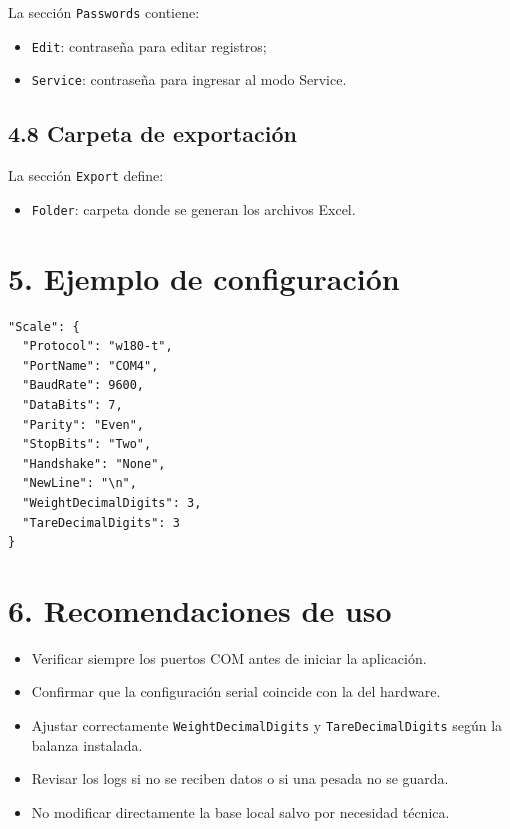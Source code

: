 \documentclass[12pt,a4paper]{article}
\begin{document}
La secci\'on \texttt{Passwords} contiene:

\begin{itemize}
\item \texttt{Edit}: contrase\~na para editar registros;
\item \texttt{Service}: contrase\~na para ingresar al modo Service.
\end{itemize}

\subsection*{4.8 Carpeta de exportaci\'on}

La secci\'on \texttt{Export} define:

\begin{itemize}
\item \texttt{Folder}: carpeta donde se generan los archivos Excel.
\end{itemize}

\section*{5. Ejemplo de configuraci\'on}

\begin{verbatim}
"Scale": {
  "Protocol": "w180-t",
  "PortName": "COM4",
  "BaudRate": 9600,
  "DataBits": 7,
  "Parity": "Even",
  "StopBits": "Two",
  "Handshake": "None",
  "NewLine": "\n",
  "WeightDecimalDigits": 3,
  "TareDecimalDigits": 3
}
\end{verbatim}

\section*{6. Recomendaciones de uso}

\begin{itemize}
\item Verificar siempre los puertos COM antes de iniciar la aplicaci\'on.
\item Confirmar que la configuraci\'on serial coincide con la del hardware.
\item Ajustar correctamente \texttt{WeightDecimalDigits} y \texttt{TareDecimalDigits} seg\'un la balanza instalada.
\item Revisar los logs si no se reciben datos o si una pesada no se guarda.
\item No modificar directamente la base local salvo por necesidad t\'ecnica.
\end{itemize}
\end{document}
